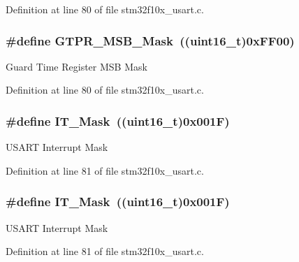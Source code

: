 Definition at line 80 of file stm32f10x\+\_\+usart.\+c.

\subsubsection[{\texorpdfstring{G\+T\+P\+R\+\_\+\+M\+S\+B\+\_\+\+Mask}{GTPR_MSB_Mask}}]{\setlength{\rightskip}{0pt plus 5cm}\#define G\+T\+P\+R\+\_\+\+M\+S\+B\+\_\+\+Mask~(({\bf uint16\+\_\+t})0x\+F\+F00)}\hypertarget{group___u_s_a_r_t___private___defines_ga405b4222892bafdf1d084de5efd24d70}{}\label{group___u_s_a_r_t___private___defines_ga405b4222892bafdf1d084de5efd24d70}
Guard Time Register M\+SB Mask 

Definition at line 80 of file stm32f10x\+\_\+usart.\+c.

\subsubsection[{\texorpdfstring{I\+T\+\_\+\+Mask}{IT_Mask}}]{\setlength{\rightskip}{0pt plus 5cm}\#define I\+T\+\_\+\+Mask~(({\bf uint16\+\_\+t})0x001\+F)}\hypertarget{group___u_s_a_r_t___private___defines_ga401c753d4de6ab56fcb026c91b8c8487}{}\label{group___u_s_a_r_t___private___defines_ga401c753d4de6ab56fcb026c91b8c8487}
U\+S\+A\+RT Interrupt Mask 

Definition at line 81 of file stm32f10x\+\_\+usart.\+c.

\subsubsection[{\texorpdfstring{I\+T\+\_\+\+Mask}{IT_Mask}}]{\setlength{\rightskip}{0pt plus 5cm}\#define I\+T\+\_\+\+Mask~(({\bf uint16\+\_\+t})0x001\+F)}\hypertarget{group___u_s_a_r_t___private___defines_ga401c753d4de6ab56fcb026c91b8c8487}{}\label{group___u_s_a_r_t___private___defines_ga401c753d4de6ab56fcb026c91b8c8487}
U\+S\+A\+RT Interrupt Mask 

Definition at line 81 of file stm32f10x\+\_\+usart.\+c.

